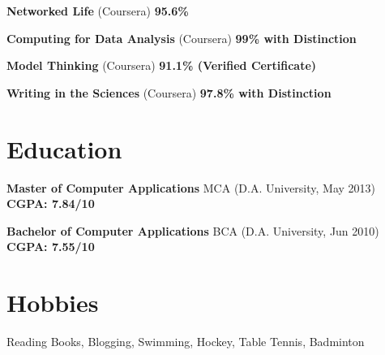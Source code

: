 \documentclass[margin,line]{resume}
\begin{document}
\begin{resume}
\begin{list2}
	\item \textbf{Networked Life} (Coursera) \hspace{104mm} \textbf{95.6\%}

	\item \textbf{Computing for Data Analysis} (Coursera) \hspace{52mm} \textbf{99\% with Distinction}

    \item \textbf{Model Thinking} (Coursera) \hspace{65mm} \textbf{91.1\% (Verified Certificate)}

	\item \textbf{Writing in the Sciences} (Coursera) \hspace{60mm} \textbf{97.8\% with Distinction}
	\end{list2}

    \section{\mysidestyle Education}

    \begin{list2}
	\item \textbf{Master of Computer Applications} MCA (D.A. University, May 2013) \hspace{16mm} \textbf{CGPA: 7.84/10} 
	\end{list2}

	\begin{list2}
	\item \textbf{Bachelor of Computer Applications} BCA (D.A. University, Jun 2010) \hspace{15mm} \textbf{CGPA: 7.55/10}
	\end{list2}

    \section{\mysidestyle Hobbies}
    \begin{list2}
    \item Reading Books, Blogging, Swimming, Hockey, Table Tennis, Badminton
     
    \end{list2}

\end{resume}
\end{document}
